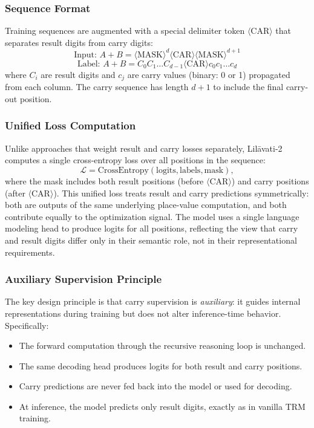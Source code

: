 \subsubsection{Sequence Format}
Training sequences are augmented with a special delimiter token $\langle \text{CAR} \rangle$ that separates result digits from carry digits:
\[
\text{Input: } A + B = \langle \text{MASK} \rangle^d \langle \text{CAR} \rangle \langle \text{MASK} \rangle^{d+1}
\]
\[
\text{Label: } A + B = C_0 C_1 \ldots C_{d-1} \langle \text{CAR} \rangle c_0 c_1 \ldots c_d
\]
where $C_i$ are result digits and $c_j$ are carry values (binary: 0 or 1) propagated from each column. The carry sequence has length $d+1$ to include the final carry-out position.

\subsubsection{Unified Loss Computation}
Unlike approaches that weight result and carry losses separately, Lil\={a}vati-2 computes a single cross-entropy loss over all positions in the sequence:
\[
\mathcal{L} = \text{CrossEntropy}(\text{logits}, \text{labels}, \text{mask}),
\]
where the mask includes both result positions (before $\langle \text{CAR} \rangle$) and carry positions (after $\langle \text{CAR} \rangle$). This unified loss treats result and carry predictions symmetrically: both are outputs of the same underlying place-value computation, and both contribute equally to the optimization signal. The model uses a single language modeling head to produce logits for all positions, reflecting the view that carry and result digits differ only in their semantic role, not in their representational requirements.

\subsubsection{Auxiliary Supervision Principle}
The key design principle is that carry supervision is \emph{auxiliary}: it guides internal representations during training but does not alter inference-time behavior. Specifically:
\begin{itemize}
\item The forward computation through the recursive reasoning loop is unchanged.
\item The same decoding head produces logits for both result and carry positions.
\item Carry predictions are never fed back into the model or used for decoding.
\item At inference, the model predicts only result digits, exactly as in vanilla TRM training.
\end{itemize}

